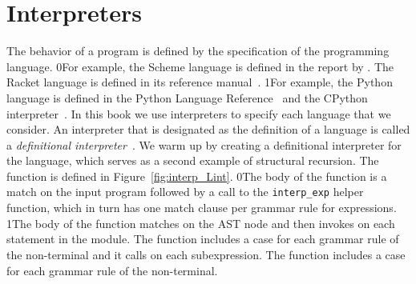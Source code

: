 \documentclass[7x10,nocrop]{TimesAPriori_MIT}%
\def\racketEd{0}
\def\pythonEd{1}
\def\edition{1}
\newcommand{\racket}[1]{{\if\edition\racketEd{#1}\fi}}
\newcommand{\python}[1]{{\if\edition\pythonEd #1\fi}}
\begin{document}
\section{Interpreters}
\label{sec:interp_Lint}

The behavior of a program is defined by the specification of the
programming language.
%
\racket{For example, the Scheme language is defined in the report by
  \cite{SPERBER:2009aa}. The Racket language is defined in its
  reference manual~\citep{plt-tr}.}
%
\python{For example, the Python language is defined in the Python
  Language Reference~\citep{PSF21:python_ref} and the CPython interpreter~\citep{PSF21:cpython}.}
%
In this book we use interpreters
to specify each language that we consider. An interpreter that is
designated as the definition of a language is called a
\emph{definitional interpreter}~\citep{reynolds72:_def_interp}.
 We warm up by creating a
definitional interpreter for the \LangInt{} language, which serves as
a second example of structural recursion. The 
function is defined in Figure~\ref{fig:interp_Lint}.
%
\racket{The body of the function is a match on the input program
  followed by a call to the \lstinline{interp_exp} helper function,
  which in turn has one match clause per grammar rule for \LangInt{}
  expressions.}
%
\python{The body of the function matches on the  AST node
  and then invokes \code{interp\_stmt} on each statement in the
  module.  The \code{interp\_stmt} function includes a case for each
  grammar rule of the \Stmt{} non-terminal and it calls
  \code{interp\_exp} on each subexpression.  The \code{interp\_exp}
  function includes a case for each grammar rule of the \Exp{}
  non-terminal.}
\end{document}
